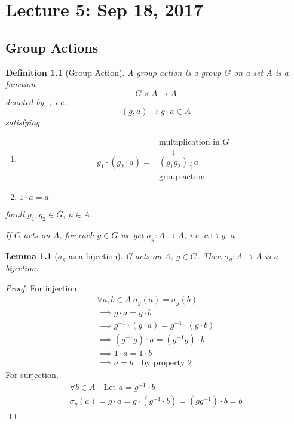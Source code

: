 \documentclass[11pt, oneside]{book}
\theoremstyle{break}
\newtheorem*{proof}{Proof}
\newtheorem{lemma}{Lemma}[section]
\newtheorem{defn}{Definition}[section]
\begin{document}
\chapter{Lecture 5: Sep 18, 2017}\label{lec5}

\section{Group Actions}\label{sect:group_actions}

\begin{defn}[Group Action]
    A group action is a group $G$ on a set $A$ is a function
    \begin{equation}
        G \times A \to A
    \end{equation}
    denoted by $\cdot$, i.e.
    \begin{equation}
        (g, a) \mapsto g \cdot a \in A
    \end{equation}
    satisfying
    \begin{enumerate}
        \item \begin{align*}
                            &\text{multiplication in $G$} \\
            g_1 \cdot (g_2 \cdot a) = &\overset{\downarrow}{(g_1 g_2)} \underset{\uparrow}{\cdot} a \\
                            &\text{group action}
        \end{align*}

        \item $1 \cdot a = a$
    \end{enumerate}
    forall $g_1, g_2 \in G, \; a \in A$.

    If $G$ acts on $A$, for each $g \in G$ we get $\sigma_g : A \to A$, i.e. $a \mapsto g \cdot a$
\end{defn}

\begin{lemma}[$\sigma_g$ as a bijection]
    \label{lemma:6}
    G acts on A, $g \in G$. Then $\sigma_g: A \to A$ is a bijection.
\end{lemma}

\begin{proof}
    For injection,
    \begin{gather*}
        \forall a, b \in A \; \sigma_g(a) = \sigma_g(b) \\
        \implies g \cdot a = g \cdot b \\
        \implies g^{-1} \cdot (g \cdot a) = g^{-1} \cdot (g \cdot b) \\
        \implies (g^{-1} g) \cdot a = (g^{-1} g) \cdot b \\
        \implies 1 \cdot a = 1 \cdot b \\
        \implies a = b \quad \text{by property 2}
    \end{gather*}
    For surjection,
    \begin{gather*}
        \forall b \in A \quad \text{Let } a = g^{-1} \cdot b \\
        \sigma_g (a) = g \cdot a =  g \cdot (g^{-1} \cdot b) = (gg^{-1}) \cdot b = b
    \end{gather*}
\end{proof}
\end{document}
